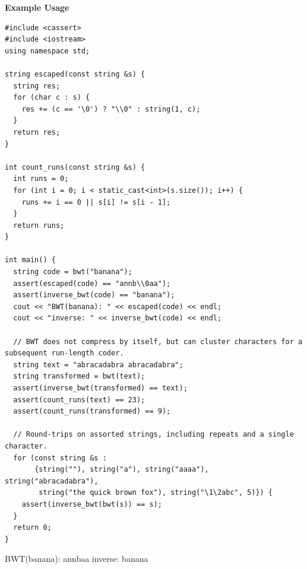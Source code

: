 \textbf{Example Usage}\par
\begin{lstlisting}[style=cpp]
#include <cassert>
#include <iostream>
using namespace std;

string escaped(const string &s) {
  string res;
  for (char c : s) {
    res += (c == '\0') ? "\\0" : string(1, c);
  }
  return res;
}

int count_runs(const string &s) {
  int runs = 0;
  for (int i = 0; i < static_cast<int>(s.size()); i++) {
    runs += i == 0 || s[i] != s[i - 1];
  }
  return runs;
}

int main() {
  string code = bwt("banana");
  assert(escaped(code) == "annb\\0aa");
  assert(inverse_bwt(code) == "banana");
  cout << "BWT(banana): " << escaped(code) << endl;
  cout << "inverse: " << inverse_bwt(code) << endl;

  // BWT does not compress by itself, but can cluster characters for a subsequent run-length coder.
  string text = "abracadabra abracadabra";
  string transformed = bwt(text);
  assert(inverse_bwt(transformed) == text);
  assert(count_runs(text) == 23);
  assert(count_runs(transformed) == 9);

  // Round-trips on assorted strings, including repeats and a single character.
  for (const string &s :
       {string(""), string("a"), string("aaaa"), string("abracadabra"),
        string("the quick brown fox"), string("\1\2abc", 5)}) {
    assert(inverse_bwt(bwt(s)) == s);
  }
  return 0;
}
\end{lstlisting}
\begin{exampleoutput}
BWT(banana): annb\0aa
inverse: banana
\end{exampleoutput}

